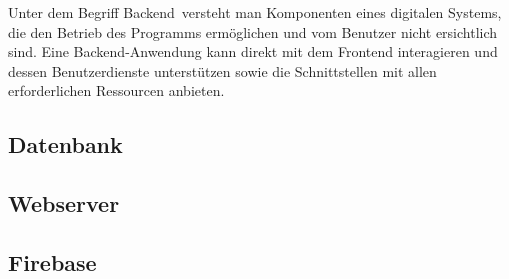 Unter dem Begriff \glqq Backend\grqq \, versteht man Komponenten eines digitalen Systems, die den Betrieb des Programms ermöglichen und vom Benutzer nicht ersichtlich sind.
\newline
Eine Backend-Anwendung kann direkt mit dem Frontend interagieren und dessen Benutzerdienste unterstützen sowie die Schnittstellen mit allen erforderlichen Ressourcen anbieten.

\subsection{Datenbank}


\subsection{Webserver}




\subsection{Firebase}
\label{sec:implementierung_firebase}

